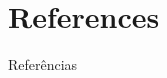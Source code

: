 \documentclass{uspBeamer}
\begin{document}


				




    \section*{References}
    \begin{frame}{Referências}
        
    \end{frame}

\end{document}
